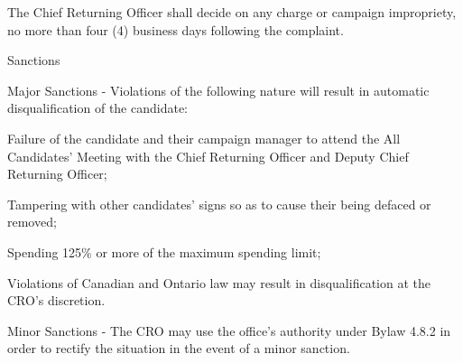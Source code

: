 \begin{longenum}[ label*=\thesection.\arabic*., align=left]
\begin{longenum}[label*=\arabic*., align=left]
\item The Chief Returning Officer shall decide on any charge or campaign impropriety, no more than four (4) business days following the complaint.
\item Sanctions
	\begin{longenum}[label*=\arabic*., align=left]
\item Major Sanctions - Violations of the following nature will result in automatic disqualification of the candidate:
	\begin{longenum}[label*=\arabic*., align=left]
\item Failure of the candidate and their campaign manager to attend the All Candidates' Meeting with the Chief Returning Officer and Deputy Chief Returning Officer;
\item Tampering with other candidates' signs so as to cause their being defaced or removed;
\item Spending 125\% or more of the maximum spending limit;
\item Violations of Canadian and Ontario law may result in disqualification at the CRO's discretion.
\end{longenum}
\item Minor Sanctions - The CRO may use the office's authority under Bylaw 4.8.2 in order to 
rectify the situation in the event of a minor sanction.
\end{longenum}
 \end{longenum}
 

\end{longenum}
